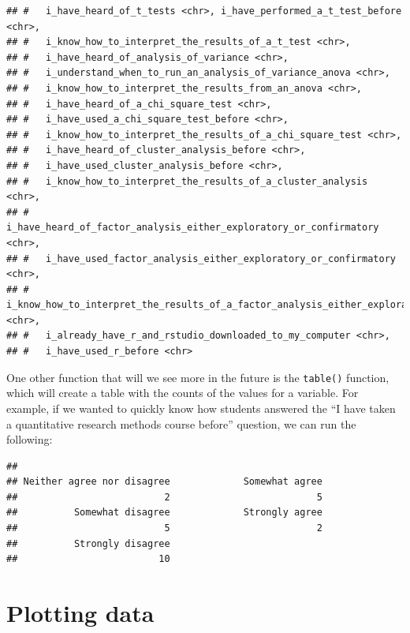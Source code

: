 \documentclass[
]{book}
\newenvironment{Shaded}{\begin{snugshade}}{\end{snugshade}}
\newcommand{\FunctionTok}[1]{\textcolor[rgb]{0.00,0.00,0.00}{#1}}
\newcommand{\NormalTok}[1]{#1}
\newcommand{\SpecialCharTok}[1]{\textcolor[rgb]{0.00,0.00,0.00}{#1}}
\begin{document}
\begin{verbatim}
## #   i_have_heard_of_t_tests <chr>, i_have_performed_a_t_test_before <chr>,
## #   i_know_how_to_interpret_the_results_of_a_t_test <chr>,
## #   i_have_heard_of_analysis_of_variance <chr>,
## #   i_understand_when_to_run_an_analysis_of_variance_anova <chr>,
## #   i_know_how_to_interpret_the_results_from_an_anova <chr>,
## #   i_have_heard_of_a_chi_square_test <chr>,
## #   i_have_used_a_chi_square_test_before <chr>,
## #   i_know_how_to_interpret_the_results_of_a_chi_square_test <chr>,
## #   i_have_heard_of_cluster_analysis_before <chr>,
## #   i_have_used_cluster_analysis_before <chr>,
## #   i_know_how_to_interpret_the_results_of_a_cluster_analysis <chr>,
## #   i_have_heard_of_factor_analysis_either_exploratory_or_confirmatory <chr>,
## #   i_have_used_factor_analysis_either_exploratory_or_confirmatory <chr>,
## #   i_know_how_to_interpret_the_results_of_a_factor_analysis_either_exploratory_or_confirmatory <chr>,
## #   i_already_have_r_and_rstudio_downloaded_to_my_computer <chr>,
## #   i_have_used_r_before <chr>
\end{verbatim}

One other function that will we see more in the future is the \texttt{table()} function, which will create a table with the counts of the values for a variable. For example, if we wanted to quickly know how students answered the ``I have taken a quantitative research methods course before'' question, we can run the following:

\begin{Shaded}
\end{Shaded}

\begin{verbatim}
## 
## Neither agree nor disagree             Somewhat agree 
##                          2                          5 
##          Somewhat disagree             Strongly agree 
##                          5                          2 
##          Strongly disagree 
##                         10
\end{verbatim}

\hypertarget{plotting-data}{%
\section{Plotting data}\label{plotting-data}}
\end{document}

